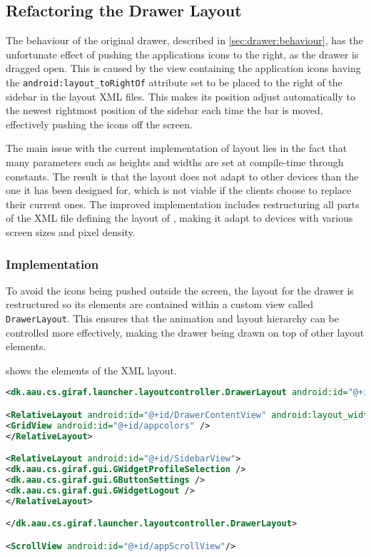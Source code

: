 \subsection{Refactoring the Drawer Layout}
The behaviour of the original drawer, described in \cref{sec:drawer:behaviour}, has the unfortunate effect of pushing the applications icons to the right, as the drawer is dragged open.
This is caused by the view containing the application icons having the  \lstinline{android:layout_toRightOf} attribute set to be placed to the right of the sidebar in the layout XML files.
This makes its position adjust automatically to the newest rightmost position of the sidebar each time the bar is moved, effectively pushing the icons off the screen.

The main issue with the current implementation of \homeactivity layout lies in the fact that many parameters such as heights and widths are set at compile-time through constants.
The result is that the layout does not adapt to other devices than the one it has been designed for, which is not viable if the clients choose to replace their current ones.
The improved implementation includes restructuring all parts of the XML file defining the layout of  \homeactivity, making it adapt to devices with various screen sizes and pixel density.

\subsubsection{Implementation}\label{sec:sidebarlayout:xml}
To avoid the icons being pushed outside the screen, the layout for the drawer is restructured so its elements are contained within a custom view called \lstinline|DrawerLayout|.
This ensures that the animation and layout hierarchy can be controlled more effectively, making the drawer being drawn on top of other layout elements.

 shows the elements of the XML layout.

\begin{lstlisting}[caption={Structure of the XML layout of the drawer. Note that some attributes are omitted.},label={lst:sidebarlayout}, language=XML]
<dk.aau.cs.giraf.launcher.layoutcontroller.DrawerLayout android:id="@+id/DrawerView" android:layout_marginLeft="-400dp">

<RelativeLayout android:id="@+id/DrawerContentView" android:layout_width="400dp">
<GridView android:id="@+id/appcolors" />
</RelativeLayout>

<RelativeLayout android:id="@+id/SidebarView">
<dk.aau.cs.giraf.gui.GWidgetProfileSelection />
<dk.aau.cs.giraf.gui.GButtonSettings />
<dk.aau.cs.giraf.gui.GWidgetLogout />
</RelativeLayout>

</dk.aau.cs.giraf.launcher.layoutcontroller.DrawerLayout>

<ScrollView android:id="@+id/appScrollView"/>
\end{lstlisting}

